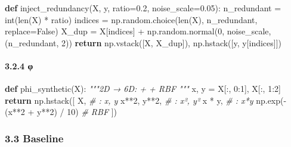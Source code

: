 \documentclass[
  12pt,
]{article}
\newenvironment{Shaded}{}{}
\newcommand{\BuiltInTok}[1]{\textcolor[rgb]{0.00,0.50,0.00}{#1}}
\newcommand{\CommentTok}[1]{\textcolor[rgb]{0.38,0.63,0.69}{\textit{#1}}}
\newcommand{\ControlFlowTok}[1]{\textcolor[rgb]{0.00,0.44,0.13}{\textbf{#1}}}
\newcommand{\DecValTok}[1]{\textcolor[rgb]{0.25,0.63,0.44}{#1}}
\newcommand{\FloatTok}[1]{\textcolor[rgb]{0.25,0.63,0.44}{#1}}
\newcommand{\KeywordTok}[1]{\textcolor[rgb]{0.00,0.44,0.13}{\textbf{#1}}}
\newcommand{\NormalTok}[1]{#1}
\newcommand{\OperatorTok}[1]{\textcolor[rgb]{0.40,0.40,0.40}{#1}}
\newcommand{\VariableTok}[1]{\textcolor[rgb]{0.10,0.09,0.49}{#1}}
\begin{document}
\begin{Shaded}
\begin{Highlighting}[]
\KeywordTok{def}\NormalTok{ inject\_redundancy(X, y, ratio}\OperatorTok{=}\FloatTok{0.2}\NormalTok{, noise\_scale}\OperatorTok{=}\FloatTok{0.05}\NormalTok{):}
\NormalTok{    n\_redundant }\OperatorTok{=} \BuiltInTok{int}\NormalTok{(}\BuiltInTok{len}\NormalTok{(X) }\OperatorTok{*}\NormalTok{ ratio)}
\NormalTok{    indices }\OperatorTok{=}\NormalTok{ np.random.choice(}\BuiltInTok{len}\NormalTok{(X), n\_redundant, replace}\OperatorTok{=}\VariableTok{False}\NormalTok{)}
\NormalTok{    X\_dup }\OperatorTok{=}\NormalTok{ X[indices] }\OperatorTok{+}\NormalTok{ np.random.normal(}\DecValTok{0}\NormalTok{, noise\_scale, (n\_redundant, }\DecValTok{2}\NormalTok{))}
    \ControlFlowTok{return}\NormalTok{ np.vstack([X, X\_dup]), np.hstack([y, y[indices]])}
\end{Highlighting}
\end{Shaded}

\paragraph{3.2.4  φ}\label{ux8868ux793aux7a7aux95f4-ux3c6}

\begin{Shaded}
\begin{Highlighting}[]
\KeywordTok{def}\NormalTok{ phi\_synthetic(X):}
    \CommentTok{"""2D → 6D:  +  + RBF """}
\NormalTok{    x, y }\OperatorTok{=}\NormalTok{ X[:, }\DecValTok{0}\NormalTok{:}\DecValTok{1}\NormalTok{], X[:, }\DecValTok{1}\NormalTok{:}\DecValTok{2}\NormalTok{]}
    \ControlFlowTok{return}\NormalTok{ np.hstack([}
\NormalTok{        X,                    }\CommentTok{\# : x, y}
\NormalTok{        x}\OperatorTok{**}\DecValTok{2}\NormalTok{, y}\OperatorTok{**}\DecValTok{2}\NormalTok{,           }\CommentTok{\# : x², y²}
\NormalTok{        x }\OperatorTok{*}\NormalTok{ y,                }\CommentTok{\# : x*y}
\NormalTok{        np.exp(}\OperatorTok{{-}}\NormalTok{(x}\OperatorTok{**}\DecValTok{2} \OperatorTok{+}\NormalTok{ y}\OperatorTok{**}\DecValTok{2}\NormalTok{) }\OperatorTok{/} \DecValTok{10}\NormalTok{)  }\CommentTok{\# RBF}
\NormalTok{    ])}
\end{Highlighting}
\end{Shaded}

\subsubsection{3.3 Baseline }\label{baseline-ux5bf9ux6bd4}
\end{document}
